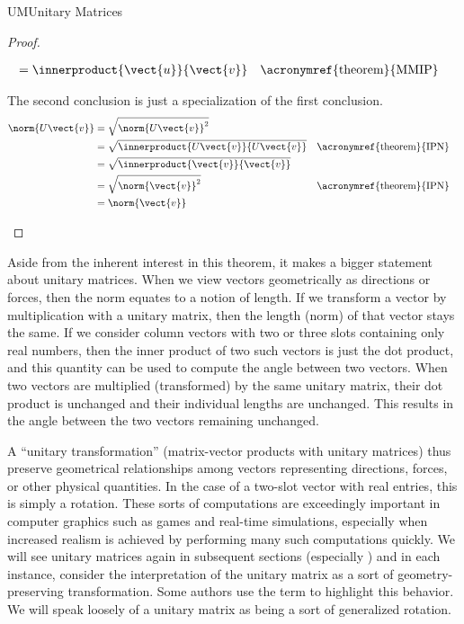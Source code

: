 \begin{subsect}{UM}{Unitary Matrices}
\begin{proof}
\begin{para}
\begin{align*}
%
&=\innerproduct{\vect{u}}{\vect{v}}
&&\text{\acronymref{theorem}{MMIP}}
%
\end{align*}\end{para}
%
\begin{para}The second conclusion is just a specialization of the first conclusion.
%
\begin{align*}
\norm{U\vect{v}}
&=\sqrt{\norm{U\vect{v}}^2}\\
&=\sqrt{\innerproduct{U\vect{v}}{U\vect{v}}}&&\text{\acronymref{theorem}{IPN}}\\
&=\sqrt{\innerproduct{\vect{v}}{\vect{v}}}\\
&=\sqrt{\norm{\vect{v}}^2}&&\text{\acronymref{theorem}{IPN}}\\
&=\norm{\vect{v}}
\end{align*}
\end{para}
%
\end{proof}
%
\begin{para}Aside from the inherent interest in this theorem, it makes a bigger statement about unitary matrices.  When we view vectors geometrically as directions or forces, then the norm equates to a notion of length.  If we transform a vector by multiplication with a unitary matrix, then the length (norm) of that vector stays the same.  If we consider column vectors with two or three slots containing only real numbers, then the inner product of two such vectors is just the dot product, and this quantity can be used to compute the angle between two vectors.  When two vectors are multiplied (transformed) by the same unitary matrix, their dot product is unchanged and their individual lengths are unchanged.  This results in the angle between the two vectors remaining unchanged.\end{para}
%
\begin{para}A ``unitary transformation'' (matrix-vector products with unitary matrices) thus preserve geometrical relationships among vectors representing directions, forces, or other physical quantities.  In the case of a two-slot vector with real entries, this is simply a rotation.  These sorts of computations are exceedingly important in computer graphics such as games and real-time simulations, especially when increased realism is achieved by performing many such computations quickly.  We will see unitary matrices again in subsequent sections (especially ) and in each instance, consider the interpretation of the unitary matrix as a sort of geometry-preserving transformation.  Some authors use the term  to highlight this behavior.  We will speak loosely of a unitary matrix as being a sort of generalized rotation.\end{para}

\end{subsect}
